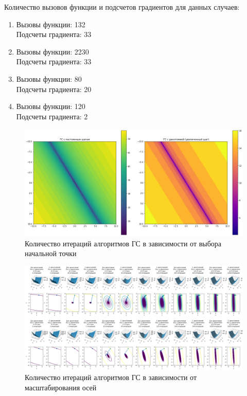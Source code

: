 Количество вызовов функции и подсчетов градиентов для данных случаев:
    \begin{enumerate}
    \item Вызовы функции: 132 \\
    Подсчеты градиента: 33
    \item Вызовы функции: 2230 \\
    Подсчеты градиента: 33
    \item Вызовы функции: 80 \\
    Подсчеты градиента: 20
    \item Вызовы функции: 120 \\
    Подсчеты градиента: 2
    \end{enumerate}
\begin{landscape}
\begin{vplace}[1.0]
\begin{figure}[ht]
    \centering
    \includegraphics[width=1.5\textwidth]{images/4c.png}
    \caption{Количество итераций алгоритмов ГС в зависимости от выбора начальной точки}
    \label{fig:4c}
\end{figure}
\end{vplace}
\end{landscape}
\begin{landscape}
\begin{vplace}[1.0]
\begin{figure}[ht]
    \centering
    \includegraphics[width=1.5\textwidth]{images/4d.png}
    \caption{Количество итераций алгоритмов ГС в зависимости от масштабирования осей}
    \label{fig:4d}
\end{figure}
\end{vplace}
\end{landscape}
